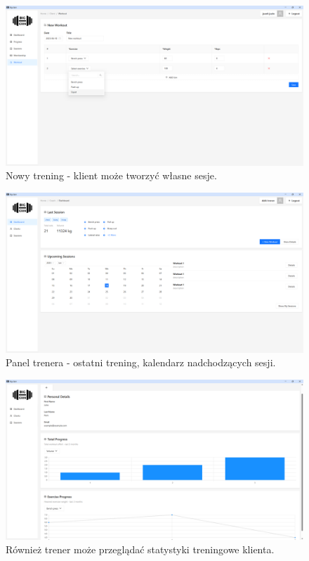 \documentclass[../../spr.tex]{subfiles}
\begin{document}
\begin{figure}[H]
  \centering
  \includegraphics[width=\textwidth]{img/new_workout.png}
  \caption{Nowy trening - klient może tworzyć własne sesje.}
\end{figure}

\begin{figure}[H]
  \centering
  \includegraphics[width=\textwidth]{img/coach_dashboard.png}
  \caption{Panel trenera - ostatni trening, kalendarz nadchodzących sesji.}
\end{figure}

\begin{figure}[H]
  \centering
  \includegraphics[width=\textwidth]{img/coach_client.png}
  \caption{Również trener może przeglądać statystyki treningowe klienta.}
\end{figure}
\end{document}
